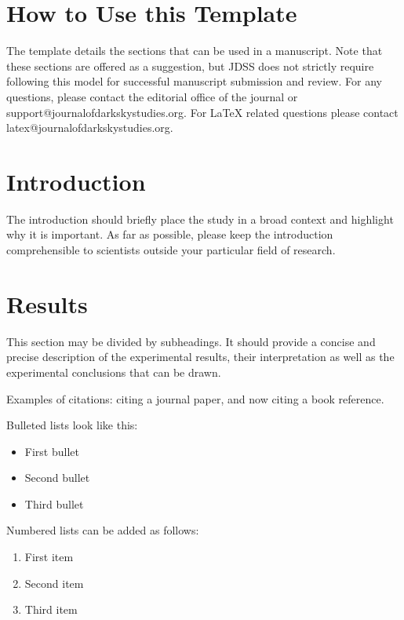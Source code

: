 \documentclass[jdss,article,submit,moreauthors,pdftex]{Definitions/jdss}
\begin{document}
\setcounter{section}{-1} %
\section{How to Use this Template}
The template details the sections that can be used in a manuscript. Note that these sections are offered as a suggestion, but JDSS does not strictly require following this model for successful manuscript submission and review. For any questions, please contact the editorial office of the journal or support@journalofdarkskystudies.org. For LaTeX related questions please contact latex@journalofdarkskystudies.org.

\section{Introduction}
The introduction should briefly place the study in a broad context and highlight why it is important. As far as possible, please keep the introduction comprehensible to scientists outside your particular field of research. 
 
\section{Results}

This section may be divided by subheadings. It should provide a concise and precise description of the experimental results, their interpretation as well as the experimental conclusions that can be drawn.

Examples of citations: citing a journal paper, \cite{ref-journal} and now citing a book reference. \cite{ref-book}

Bulleted lists look like this:
\begin{itemize}[leftmargin=*,labelsep=5.8mm]
\item	First bullet
\item	Second bullet
\item	Third bullet
\end{itemize}

Numbered lists can be added as follows:
\begin{enumerate}[leftmargin=*,labelsep=4.9mm]
\item	First item 
\item	Second item
\item	Third item
\end{enumerate}
\end{document}

